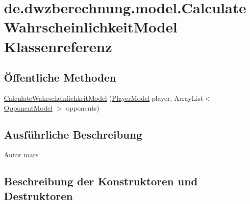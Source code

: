 \hypertarget{classde_1_1dwzberechnung_1_1model_1_1_calculate_wahrscheinlichkeit_model}{}\section{de.\+dwzberechnung.\+model.\+Calculate\+Wahrscheinlichkeit\+Model Klassenreferenz}
\label{classde_1_1dwzberechnung_1_1model_1_1_calculate_wahrscheinlichkeit_model}
\subsection*{Öffentliche Methoden}
\begin{DoxyCompactItemize}
\item 
\hyperlink{classde_1_1dwzberechnung_1_1model_1_1_calculate_wahrscheinlichkeit_model_ad0dac230e5ecd7a6d333cd767f974c42}{Calculate\+Wahrscheinlichkeit\+Model} (\hyperlink{classde_1_1dwzberechnung_1_1model_1_1_player_model}{Player\+Model} player, Array\+List$<$ \hyperlink{classde_1_1dwzberechnung_1_1model_1_1_opponent_model}{Opponent\+Model} $>$ opponents)
\end{DoxyCompactItemize}


\subsection{Ausführliche Beschreibung}
\begin{DoxyAuthor}{Autor}
mars 
\end{DoxyAuthor}


\subsection{Beschreibung der Konstruktoren und Destruktoren}
